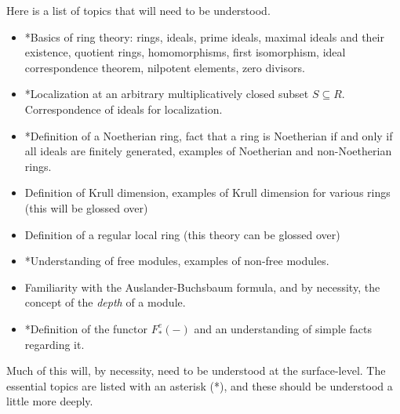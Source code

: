 Here is a list of topics that will need to be understood.
\begin{itemize}
	\item *Basics of ring theory: rings, ideals, prime ideals, maximal ideals and their existence, quotient rings, homomorphisms, first isomorphism, ideal correspondence theorem, nilpotent elements, zero divisors.
	\item *Localization at an arbitrary multiplicatively closed subset $S\subseteq R$. Correspondence of ideals for localization.
	\item *Definition of a Noetherian ring, fact that a ring is Noetherian if and only if all ideals are finitely generated, examples of Noetherian and non-Noetherian rings.
	\item Definition of Krull dimension, examples of Krull dimension for various rings (this will be glossed over)
	\item Definition of a regular local ring (this theory can be glossed over)
	\item *Understanding of free modules, examples of non-free modules.
	\item Familiarity with the Auslander-Buchsbaum formula, and by necessity, the concept of the \emph{depth} of a module.
	\item *Definition of the functor $F^e_*(-)$ and an understanding of simple facts regarding it.
\end{itemize}
Much of this will, by necessity, need to be understood at the surface-level. The essential topics are listed with an asterisk (*), and these should be understood a little more deeply.

